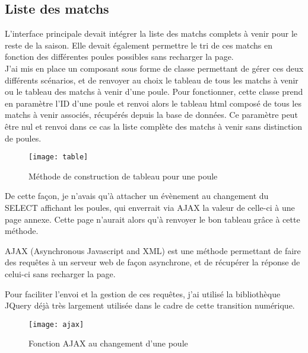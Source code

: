 \subsection{Liste des matchs}
\vspace{1cm}

L’interface principale devait intégrer la liste des matchs complets à venir pour le reste de la saison. Elle devait également permettre le tri de ces matchs en fonction des différentes poules possibles sans recharger la page.\\

J’ai mis en place un composant sous forme de classe permettant de gérer ces deux différents scénarios, et de renvoyer au choix le tableau de tous les matchs à venir ou le tableau des matchs à venir d’une poule.
Pour fonctionner, cette classe prend en paramètre l’ID d’une poule et renvoi alors le tableau html composé de tous les matchs à venir associés, récupérés depuis la base de données. 
Ce paramètre peut être nul et renvoi dans ce cas la liste complète des matchs à venir sans distinction de poules.

\begin{figure}[!h]
    \centering
    \texttt{[image: table]}
    \caption{Méthode de construction de tableau pour une poule}
\end{figure}

\newpage

De cette façon, je n’avais qu’à attacher un évènement au changement du SELECT affichant les poules, qui enverrait via AJAX la valeur de celle-ci à une page annexe. Cette page n’aurait alors qu’à renvoyer le bon tableau grâce à cette méthode.

\begin{commentaire}
AJAX (Asynchronous Javascript and XML) est une méthode permettant de faire des requêtes à un serveur web de façon asynchrone, et de récupérer la réponse de celui-ci sans recharger la page.
\end{commentaire}

Pour faciliter l’envoi et la gestion de ces requêtes, j’ai utilisé la bibliothèque JQuery déjà très largement utilisée dans le cadre de cette transition numérique.

\begin{figure}[!h]
    \centering
    \texttt{[image: ajax]}
    \caption{Fonction AJAX au changement d'une poule}
\end{figure}


